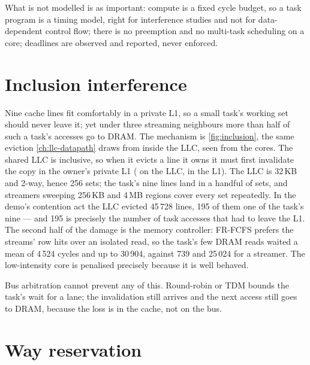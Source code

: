 What is not modelled is as important: compute is a fixed cycle budget, so a task program is a
timing model, right for interference studies and not for data-dependent control flow; there is
no preemption and no multi-task scheduling on a core; deadlines are observed and reported, never
enforced.

\section{Inclusion interference}


Nine cache lines fit comfortably in a private L1, so a small task's working set should never
leave it; yet under three streaming neighbours more than half of such a task's accesses go to
DRAM. The mechanism is \cref{fig:inclusion}, the same eviction \cref{ch:llc-datapath} draws from
inside the LLC, seen from the cores. The shared LLC is inclusive, so when it evicts a line it
owns it must first invalidate the copy in the owner's private L1 ( on the LLC,  in the L1). The LLC is
32\,KB and 2-way, hence 256 sets; the task's nine lines land in a handful of sets, and streamers
sweeping 256\,KB and 4\,MB regions cover every set repeatedly. In the demo's contention act the
LLC evicted 45\,728 lines, 195 of them one of the task's nine --- and 195 is precisely the number
of task accesses that had to leave the L1. The second half of the damage is the memory
controller: FR-FCFS prefers the streams' row hits over an isolated read, so the task's few DRAM
reads waited a mean of 4\,524 cycles and up to 30\,904, against 739 and 25\,024 for a streamer.
The low-intensity core is penalised precisely because it is well behaved.

Bus arbitration cannot prevent any of this. Round-robin or TDM bounds the task's wait for a
lane; the invalidation still arrives and the next access still goes to DRAM, because the loss is
in the cache, not on the bus.

\section{Way reservation}


